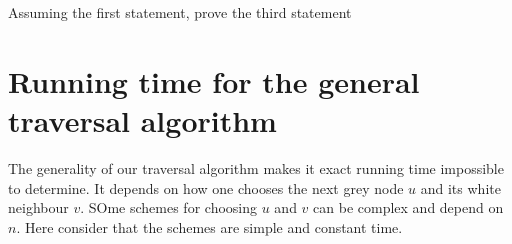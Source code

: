 
\begin{Boxample}[2]
Assuming the first statement, prove the third statement
\end{Boxample}


\section{Running time for the general traversal algorithm}

The generality
of our traversal algorithm makes it exact running time impossible to determine.  It depends on how one chooses the next grey node $u$
and its white neighbour $v$.  SOme schemes for choosing $u$ and $v$ can be complex and depend on $n$. Here consider that the schemes are simple and constant time. 


